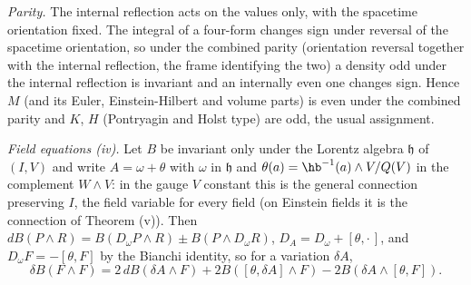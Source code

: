 \emph{Parity.} The internal reflection acts on the values only, with the spacetime orientation fixed. The integral of a four-form changes sign under reversal of the spacetime orientation, so under the combined parity (orientation reversal together with the internal reflection, the frame identifying the two) a density odd under the internal reflection is invariant and an internally even one changes sign. Hence $M$ (and its Euler, Einstein-Hilbert and volume parts) is even under the combined parity and $K$, $H$ (Pontryagin and Holst type) are odd, the usual assignment.

\emph{Field equations (iv).} Let $B$ be invariant only under the Lorentz algebra $\mathfrak{h}$ of $(I, V)$ and write $A = \omega + \theta$ with $\omega$ in $\mathfrak{h}$ and $\theta(a) = \hb^{-1}(a) \wedge V/Q(V)$ in the complement $W \wedge V$: in the gauge $V$ constant this is the general connection preserving $I$, the field variable for every field (on Einstein fields it is the connection of Theorem (v)). Then $dB(P \wedge R) = B(D_{\omega}P \wedge R) \pm B(P \wedge D_{\omega}R)$, $D_{A} = D_{\omega} + [\theta, \cdot\,]$, and $D_{\omega}F = -[\theta, F]$ by the Bianchi identity, so for a variation $\delta A$,
\[
\delta B(F \wedge F) = 2\,dB(\delta A \wedge F) + 2B([\theta, \delta A] \wedge F) - 2B(\delta A \wedge [\theta, F]) .
\]
